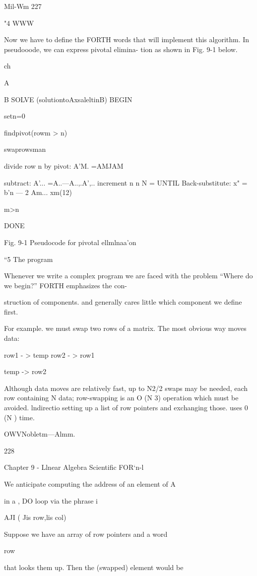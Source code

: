 {{{{{{{{{Mil-Wm 227

"4 WWW

Now we have to deﬁne the FORTH words that will implement
this algorithm. In pseudooode, we can express pivotal elimina-
tion as shown in Fig. 9-1 below.

 

ch

 

 

 

A{{ B{ }}SOLVE (solutiontoAxsaleltinB)
BEGIN

setn=0

ﬁndpivot(rowm > n)

swaprowsman

divide row n by pivot: A'M. =AMJAM

subtract: A'... =A..—A..,.A',..
increment n
n N =
UNTIL
Back-substitute: x" = b'n — 2 Am... xm(12)

m>n

DONE

 

 

Fig. 9-1 Pseudocode for pivotal ellmlnaa'on

“5 The program

Whenever we write a complex program we are faced with the
problem “Where do we begin?” FORTH emphasizes the con-

struction of components. and generally cares little which component
we deﬁne ﬁrst.

For example. we must swap two rows of a matrix. The most
obvious way moves data:

row1 - > temp
row2 - > row1

temp -> row2

Although data moves are relatively fast, up to N2/2 swaps may be
needed, each row containing N data; row-swapping is an O (N 3)
operation which must be avoided. lndirectio setting up a list of
row pointers and exchanging those. uses 0 (N ) time.

OWVNobletm—Almm.

228

Chapter 9 - Llnear Algebra Scientiﬁc FOR‘n-l

We anticipate computing the address of an element of A{{ in a ,
DO loop via the phrase i

A{{JI}} ( Jis row,lis col)

Suppose we have an array of row pointers and a word }row{ that
looks them up. Then the (swapped) element would be

}}}}}}}}}}}}
